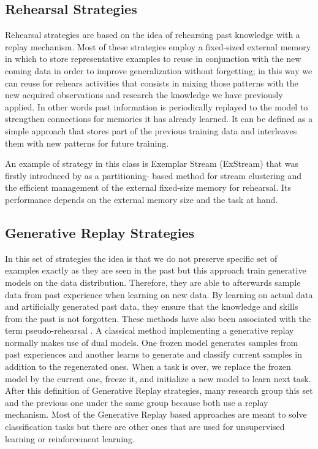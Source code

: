 \documentclass[english, LaM, oneside]{sapthesis}%
\begin{document}
\subsection{Rehearsal Strategies}
Rehearsal strategies are based on the idea of rehearsing past knowledge with a replay mechanism. Most of these strategies employ a fixed-sized external memory in which to store representative examples to reuse in conjunction with the new coming data in order to improve generalization without forgetting; in this way we can reuse for rehears activities that consists  in mixing those patterns with the new acquired observations and research the knowledge we have previously applied. In other words past information is periodically replayed to the model to strengthen connections for memories it has already learned. It can be defined as a simple approach that stores part of the previous training data and interleaves them with new patterns for future training. 

An example of strategy in this class is Exemplar Stream (ExStream) that was firstly introduced by \cite{hayes} as a partitioning- based method for stream clustering and the efficient management of the external fixed-size memory for rehearsal. Its performance depends on the external memory size and the task at hand.
\subsection{Generative Replay Strategies}
In this set of strategies the idea is that we do not preserve specific set of examples exactly as they are seen in the past but this approach train generative models on the data distribution. Therefore, they are able to afterwards sample data from past experience when learning on new data. By learning on actual data and artificially generated past data, they ensure that the knowledge and skills from the past is not forgotten. These methods have also been associated with the term pseudo-rehearsal \cite{robins} . A classical method implementing a generative replay normally makes use of dual models. One frozen model generates samples from past experiences and another learns to generate and classify current samples in addition to the regenerated ones. When a task is over, we replace the frozen model by the current one, freeze it, and initialize a new model to learn next task. After this definition of Generative Replay strategies, many research group this set and the previous one under the same group because both use a replay mechanism. Most of the Generative Replay based approaches are meant to solve classification tasks but there are other ones that are used for unsupervised learning or reinforcement learning.
\end{document}
